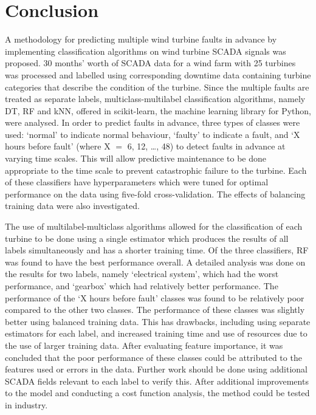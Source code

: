\chapter{Conclusion}\label{c5}

A methodology for predicting multiple wind turbine faults in advance by
implementing classification algorithms on wind turbine SCADA signals was
proposed. 30 months' worth of SCADA data for a wind farm with 25 turbines was
processed and labelled using corresponding downtime data containing turbine
categories that describe the condition of the turbine. Since the multiple
faults are treated as separate labels, multiclass-multilabel classification
algorithms, namely DT, RF and kNN, offered in scikit-learn, the machine
learning library for Python, were analysed. In order to predict faults in
advance, three types of classes were used: `normal' to indicate normal
behaviour, `faulty' to indicate a fault, and `X hours before fault' (where X
$=$ 6, 12, \dots, 48) to detect faults in advance at varying time scales.
This will allow predictive maintenance to be done appropriate to the time
scale to prevent catastrophic failure to the turbine. Each of these
classifiers have hyperparameters which were tuned for optimal performance on
the data using five-fold cross-validation. The effects of balancing training
data were also investigated.

The use of multilabel-multiclass algorithms allowed for the classification of
each turbine to be done using a single estimator which produces the results of
all labels simultaneously and has a shorter training time. Of the three
classifiers, RF was found to have the best performance overall. A detailed
analysis was done on the results for two labels, namely `electrical system',
which had the worst performance, and `gearbox' which had relatively better
performance. The performance of the `X hours before fault' classes was found
to be relatively poor compared to the other two classes. The performance of
these classes was slightly better using balanced training data. This has
drawbacks, including using separate estimators for each label, and increased
training time and use of resources due to the use of larger training data.
After evaluating feature importance, it was concluded that the poor
performance of these classes could be attributed to the features used or
errors in the data. Further work should be done using additional SCADA fields
relevant to each label to verify this. After additional improvements to the
model and conducting a cost function analysis, the method could be tested in
industry.
